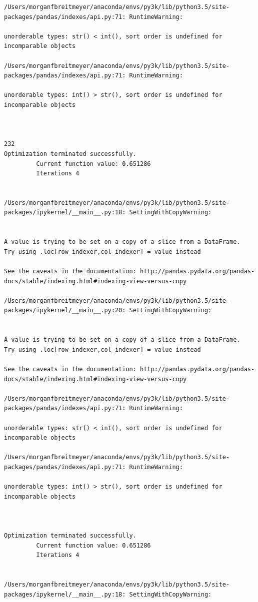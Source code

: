 \begin{lstlisting}
/Users/morganfbreitmeyer/anaconda/envs/py3k/lib/python3.5/site-packages/pandas/indexes/api.py:71: RuntimeWarning:

unorderable types: str() < int(), sort order is undefined for incomparable objects

/Users/morganfbreitmeyer/anaconda/envs/py3k/lib/python3.5/site-packages/pandas/indexes/api.py:71: RuntimeWarning:

unorderable types: int() > str(), sort order is undefined for incomparable objects



232
Optimization terminated successfully.
         Current function value: 0.651286
         Iterations 4


/Users/morganfbreitmeyer/anaconda/envs/py3k/lib/python3.5/site-packages/ipykernel/__main__.py:18: SettingWithCopyWarning:


A value is trying to be set on a copy of a slice from a DataFrame.
Try using .loc[row_indexer,col_indexer] = value instead

See the caveats in the documentation: http://pandas.pydata.org/pandas-docs/stable/indexing.html#indexing-view-versus-copy

/Users/morganfbreitmeyer/anaconda/envs/py3k/lib/python3.5/site-packages/ipykernel/__main__.py:20: SettingWithCopyWarning:


A value is trying to be set on a copy of a slice from a DataFrame.
Try using .loc[row_indexer,col_indexer] = value instead

See the caveats in the documentation: http://pandas.pydata.org/pandas-docs/stable/indexing.html#indexing-view-versus-copy

/Users/morganfbreitmeyer/anaconda/envs/py3k/lib/python3.5/site-packages/pandas/indexes/api.py:71: RuntimeWarning:

unorderable types: str() < int(), sort order is undefined for incomparable objects

/Users/morganfbreitmeyer/anaconda/envs/py3k/lib/python3.5/site-packages/pandas/indexes/api.py:71: RuntimeWarning:

unorderable types: int() > str(), sort order is undefined for incomparable objects



Optimization terminated successfully.
         Current function value: 0.651286
         Iterations 4


/Users/morganfbreitmeyer/anaconda/envs/py3k/lib/python3.5/site-packages/ipykernel/__main__.py:18: SettingWithCopyWarning:



\end{lstlisting}
